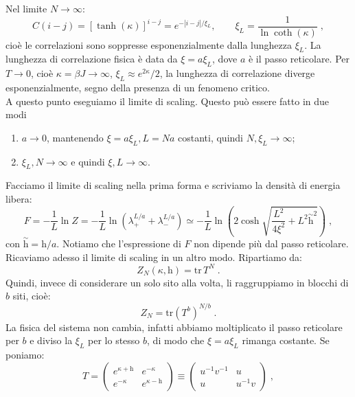 \documentclass[12pt,a4paper]{article}
\theoremstyle{definition}
\numberwithin{equation}{section}
\newcommand{\tr}{\mathrm{tr}}
\begin{document}
Nel limite $N\to\infty$:
\begin{equation}
C(i-j)=[\tanh(\kappa)]^{i-j}=e^{-|i-j|/\xi_L},\qquad \xi_L=\frac{1}{\ln\coth(\kappa)}\;,
\end{equation}
cioè le correlazioni sono soppresse esponenzialmente dalla lunghezza $\xi_L$. La lunghezza di correlazione fisica è data da $\xi=a\xi_L$, dove $a$ è il passo reticolare. Per $T\to 0$, cioè  $\kappa=\beta J\to\infty$, $\xi_L\approx e^{2\kappa}/2$, la lunghezza di correlazione diverge esponenzialmente, segno della presenza di un fenomeno critico. \\
A questo punto eseguiamo il limite di scaling. Questo può essere fatto in due modi
\begin{enumerate}
\item $a\to 0$, mantenendo $\xi=a\xi_L,L=Na$ costanti, quindi $N,\xi_L\to\infty$;
\item $\xi_L,N\to\infty$ e quindi $\xi,L\to\infty$.
\end{enumerate}
Facciamo il limite di scaling nella prima forma e scriviamo la densità di energia libera:
\begin{equation}
F=-\frac{1}{L}\ln Z=-\frac{1}{L}\ln(\lambda_+^{L/a}+\lambda_-^{L/a})\simeq -\frac{1}{L}\ln\left(2\cosh\sqrt{\frac{L^2}{4\xi^2}+L^2\stackrel{\sim}{\mathrm{h}}^2}\right)\;,
\end{equation}
con $\stackrel{\sim}{\mathrm{h}}=\mathrm{h}/a$. Notiamo che l'espressione di  $F$ non dipende più dal passo reticolare. \\
Ricaviamo adesso il limite di scaling in un altro modo. Ripartiamo da:
$$
Z_N(\kappa,\mathrm{h})=\tr\, T^N\;.
$$
Quindi, invece di considerare un solo sito alla volta, li raggruppiamo in blocchi di $b$ siti, cioè:
\begin{equation}
Z_N=\tr\left(T^b\right)^{N/b}\;.
\end{equation}
La fisica del sistema non cambia, infatti abbiamo moltiplicato il passo reticolare per $b$ e diviso la $\xi_L$ per lo stesso $b$, di modo che $\xi=a\xi_L$ rimanga costante. Se poniamo:
\begin{equation}
T=\left(\begin{matrix}
e^{\kappa+\mathrm{h}} & e^{-\kappa} \\
e^{-\kappa} & e^{\kappa-\mathrm{h}}
\end{matrix}\right)\equiv\left(\begin{matrix}
u^{-1}v^{-1} & u \\
u & u^{-1}v
\end{matrix}\right)\;,
\end{equation}
\end{document}
